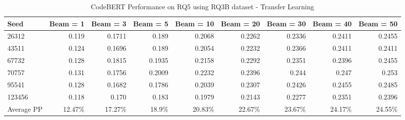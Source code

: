 \begin{table}[H]
\centering
  \caption{CodeBERT Performance on RQ5 using RQ3B dataset - Transfer Learning}
  \label{Appendices:RQ5-finetrain-CodeBERT}
  \begin{tabular}{|l|r|r|r|r|r|r|r|r|}
    \hline
    Seed          & Beam = 1            & Beam = 3          & Beam = 5          & Beam = 10   & Beam = 20     & Beam = 30     & Beam = 40     & Beam = 50\\
    \hline
    26312          & 0.119              & 0.1711            & 0.189             & 0.2068      & 0.2262        & 0.2336        & 0.2411        & 0.2455 \\
    \hline
    43511          & 0.124              & 0.1696            & 0.189             & 0.2054      & 0.2232        & 0.2366        & 0.2411        & 0.2411 \\
    \hline
    67732          & 0.128              & 0.1815            & 0.1935            & 0.2158      & 0.2292        & 0.2351        & 0.2396        & 0.2455 \\
    \hline
    70757          & 0.131              & 0.1756            & 0.2009            & 0.2232      & 0.2396        & 0.244         & 0.247         & 0.253 \\
    \hline
    95541          & 0.128              & 0.1682            & 0.1786            & 0.2039      & 0.2307        & 0.2426        & 0.2455        & 0.2485 \\
    \hline
    123456         & 0.118              & 0.170             & 0.183             & 0.1979      & 0.2143        & 0.2277        & 0.2351        & 0.2396 \\
    \hline
    Average PP     & 12.47\%            & 17.27\%           & 18.9\%            & 20.83\%     & 22.67\%       & 23.67\%       & 24.17\%       & 24.55\%  \\
    \hline
  \end{tabular}
\end{table}
%
%
%
